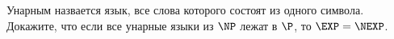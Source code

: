Унарным назвается язык, все слова которого состоят из одного символа. Докажите, что если все унарные
языки из $\NP$ лежат в $\P$, то $\EXP = \NEXP$.
